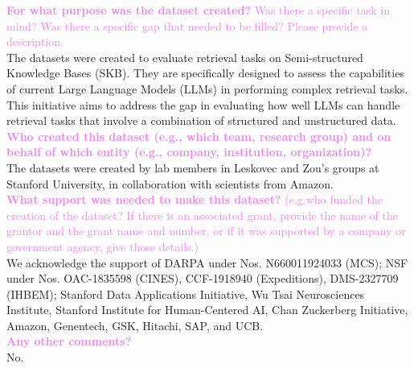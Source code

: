\documentclass{article}
\newcommand{\sectioncolor}{Violet}
\begin{document}
    \textcolor{\sectioncolor}{\textbf{
    For what purpose was the dataset created?
    }
    Was there a specific task in mind? Was there
    a specific gap that needed to be filled? Please provide a description.
    } \\
    The datasets were created to evaluate retrieval tasks on Semi-structured Knowledge Bases (SKB). They are specifically designed to assess the capabilities of current Large Language Models (LLMs) in performing complex retrieval tasks. This initiative aims to address the gap in evaluating how well LLMs can handle retrieval tasks that involve a combination of structured and unstructured data.\\
    
    \textcolor{\sectioncolor}{\textbf{
    Who created this dataset (e.g., which team, research group) and on behalf
    of which entity (e.g., company, institution, organization)?
    }
    } \\
    The datasets were created by lab members in Leskovec and Zou's groups at Stanford University, in collaboration with scientists from Amazon. \\
    
    \textcolor{\sectioncolor}{\textbf{
    What support was needed to make this dataset?
    }
    (e.g.who funded the creation of the dataset? If there is an associated
    grant, provide the name of the grantor and the grant name and number, or if
    it was supported by a company or government agency, give those details.)
    } \\
    We acknowledge the support of
    DARPA under Nos. N660011924033 (MCS);
    NSF under Nos. OAC-1835598 (CINES), CCF-1918940 (Expeditions), DMS-2327709 (IHBEM);
    Stanford Data Applications Initiative,
    Wu Tsai Neurosciences Institute,
    Stanford Institute for Human-Centered AI,
    Chan Zuckerberg Initiative,
    Amazon, Genentech, GSK, Hitachi, SAP, and UCB. \\
    
    \textcolor{\sectioncolor}{\textbf{
    Any other comments?
    }} \\
    No. \\
\end{document}
